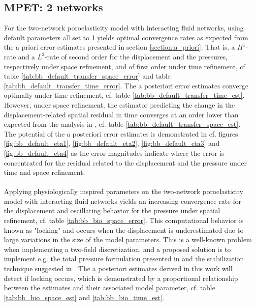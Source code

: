 \subsection{MPET: 2 networks}
For the two-network poroelasticity model with interacting fluid networks, using default parameters all set to 1 yields optimal convergence rates as expected from the a priori error estimates presented in section  \ref{section:a_priori}. That is, a $H^1$-rate and a $L^2$-rate of second order for the displacement and the pressures, respectively under space refinement, and of first order under time refinement, cf. table \ref{tab:bb_default_transfer_space_error} and table \ref{tab:bb_default_transfer_time_error}. The a posteriori error estimates converge optimally under time refinement, cf. table \ref{tab:bb_default_transfer_time_est}. However, under space refinement, the estimator predicting the change in the displacement-related spatial residual in time converges at an order lower than expected from the analysis in \cite{meunier}, cf. table \ref{tab:bb_default_transfer_space_est}. The potential of the a posteriori error estimates is demonstrated in cf. figures \ref{fig:bb_default_eta1}, \ref{fig:bb_default_eta2}, \ref{fig:bb_default_eta3} and \ref{fig:bb_default_eta4} as the error magnitudes indicate where the error is concentrated for the residual related to the displacement and the pressure under time and space refinement. 
\\
\\
Applying physiologically inspired parameters on the two-network poroelasticity model with interacting fluid networks yields an increasing convergence rate for the displacement and oscillating behavior for the pressure under spatial refinement, cf. table \ref{tab:bb_bio_space_error}. This computational behavior is known as "locking" and occurs when the displacement is underestimated due to large variations in the size of the model parameters. This is a well-known problem when implementing a two-field discretization, and a proposed solution is to implement e.g. the total pressure formulation presented in \cite{lee, lee2018} and the stabilization technique suggested in \cite{rodrigo}. The a posteriori estimates derived in this work will detect if locking occurs, which is demonstrated by a proportional relationship between the estimates and their associated model parameter, cf. table \ref{tab:bb_bio_space_est} and \ref{tab:bb_bio_time_est}.


